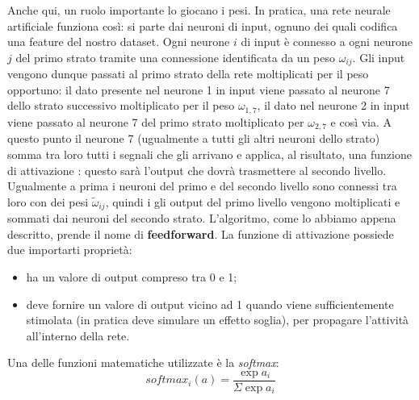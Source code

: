 \documentclass[10pt,a4paper]{report}
\begin{document}
Anche qui, un ruolo importante lo giocano i pesi. In pratica, una rete neurale artificiale funziona così: si parte dai neuroni di input, ognuno dei quali codifica una feature del nostro dataset. Ogni neurone $i$ di input è connesso a ogni neurone $j$ del primo strato tramite una connessione identificata da un peso         $\omega_{ij}$. Gli input vengono dunque passati al primo strato della rete moltiplicati per il peso opportuno: il dato presente nel neurone 1 in input viene passato al neurone 7 dello strato successivo moltiplicato per il peso $\omega_{1,7}$, il dato nel neurone 2 in input viene passato al neurone 7 del primo strato moltiplicato per $\omega_{2,7}$ e così via. A questo punto il neurone 7 (ugualmente a tutti gli altri neuroni dello strato) somma tra loro tutti i segnali che gli arrivano e applica, al risultato, una funzione di attivazione : questo sarà l'output che dovrà trasmettere al secondo livello. Ugualmente a prima i neuroni del primo e del secondo livello sono connessi tra loro con dei pesi $\tilde{\omega}_{ij}$, quindi i gli output del primo livello vengono moltiplicati e sommati dai neuroni del secondo strato. L'algoritmo, come lo abbiamo appena descritto, prende il nome di \textbf{feedforward}.
La funzione di attivazione possiede due importarti proprietà:
\begin{itemize}
\item ha un valore di output compreso tra 0 e 1;
\item deve fornire un valore di output vicino ad 1 quando viene sufficientemente stimolata (in pratica deve simulare un effetto soglia), per propagare l'attività all'interno della rete.
\end{itemize}

Una delle funzioni matematiche utilizzate è la \textit{softmax}:
\begin{equation*}
softmax_i(a) = \frac{\exp a_i}{\Sigma\exp a_i}
\end{equation*}
\end{document}

